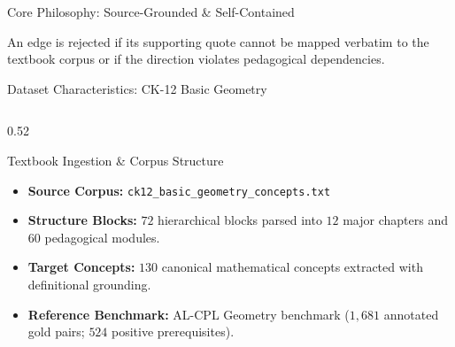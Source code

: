 \documentclass[aspectratio=169,10pt]{beamer}
\begin{document}
\begin{frame}{Core Philosophy: Source-Grounded \& Self-Contained}
    \vspace{0.4cm}
    \begin{tcolorbox}[colback=lightgraybg,colframe=accentteal,title=\textbf{Verification Rule},sharp corners]
        \small An edge is rejected if its supporting quote cannot be mapped verbatim to the textbook corpus or if the direction violates pedagogical dependencies.
    \end{tcolorbox}
\end{frame}

\begin{frame}{Dataset Characteristics: CK-12 Basic Geometry}
    \begin{columns}[T]
        \begin{column}{0.52\textwidth}
            \begin{block}{Textbook Ingestion \& Corpus Structure}
                \begin{itemize}
                    \item \textbf{Source Corpus:} \texttt{ck12\_basic\_geometry\_concepts.txt}
                    \item \textbf{Structure Blocks:} $72$ hierarchical blocks parsed into $12$ major chapters and $60$ pedagogical modules.
                    \item \textbf{Target Concepts:} $130$ canonical mathematical concepts extracted with definitional grounding.
                    \item \textbf{Reference Benchmark:} AL-CPL Geometry benchmark ($1,681$ annotated gold pairs; $524$ positive prerequisites).
                \end{itemize}
            \end{block}
        \end{column}


\end{columns}
\end{frame}
\end{document}
